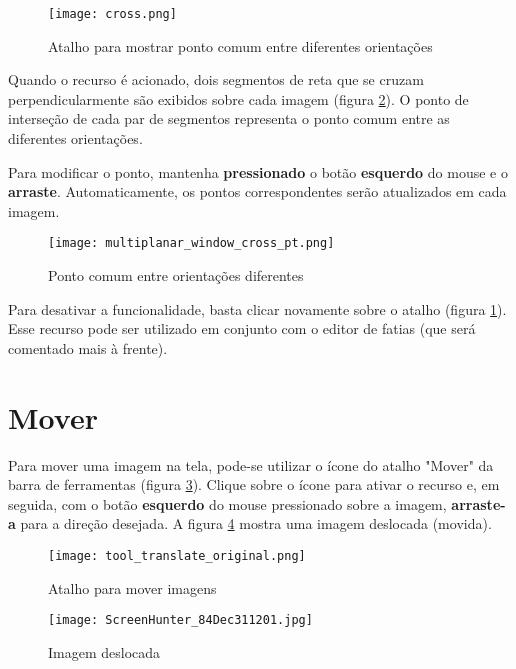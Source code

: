 \begin{figure}[!htb]
\centering
\texttt{[image: cross.png]}
\caption{Atalho para mostrar ponto comum entre diferentes orientações}
\label{fig:cross_icon}
\end{figure}

Quando o recurso é acionado, dois segmentos de reta que se cruzam perpendicularmente são exibidos
sobre cada imagem (figura \ref{fig:cross_all}). O ponto de interseção de cada par de segmentos
representa o ponto comum  entre as diferentes orientações.

\newpage

Para modificar o ponto, mantenha \textbf{pressionado} o botão \textbf{esquerdo} do mouse e o
\textbf{arraste}. Automaticamente, os pontos correspondentes serão atualizados em cada imagem.

\begin{figure}[!htb]
\centering
\texttt{[image: multiplanar\_window\_cross\_pt.png]}
\caption{Ponto comum entre orientações diferentes}
\label{fig:cross_all}
\end{figure}

Para desativar a funcionalidade, basta clicar novamente sobre o atalho (figura \ref{fig:cross_icon}).
Esse recurso pode ser utilizado em conjunto com o editor de fatias (que será comentado mais à frente).

\newpage

\section{Mover}

Para mover uma imagem na tela, pode-se utilizar o ícone do atalho "Mover" da barra de ferramentas (figura
\ref{fig:move_icon}). Clique sobre o ícone para ativar o recurso e, em seguida, com o botão
\textbf{esquerdo} do mouse pressionado sobre a imagem, \textbf{arraste-a} para a direção desejada.
A figura \ref{fig:move_img} mostra uma imagem deslocada (movida).

\begin{figure}[!htb]
\centering
\texttt{[image: tool\_translate\_original.png]}
\caption{Atalho para mover imagens}
\label{fig:move_icon}
\end{figure}

\begin{figure}[!htb]
\centering
\texttt{[image: ScreenHunter\_84Dec311201.jpg]}
\caption{Imagem deslocada}
\label{fig:move_img}
\end{figure}

